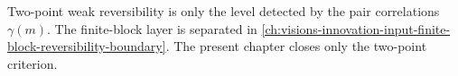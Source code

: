 \begin{principle}
\label{prin:innovation-input-finite-block-reversibility-boundary}
Two-point weak reversibility is only the level detected by the pair
correlations $\gamma(m)$. The finite-block layer is separated in
\autoref{ch:visions-innovation-input-finite-block-reversibility-boundary}.
The present chapter closes only the two-point criterion.
\end{principle}

